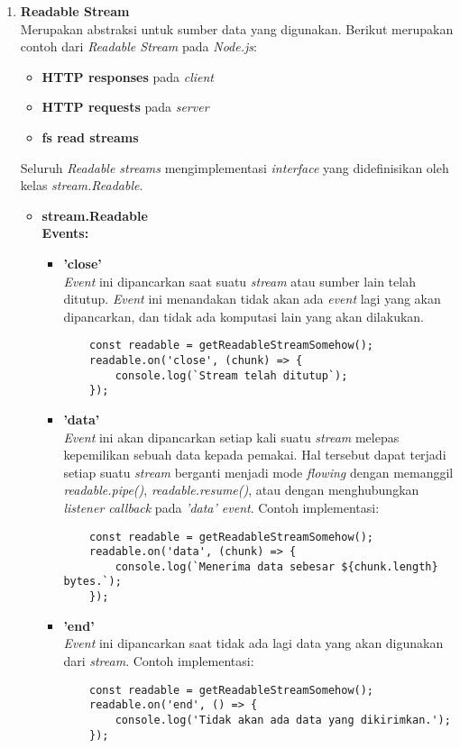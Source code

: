 \begin{enumerate}
	\item \textbf{Readable Stream} \\
	Merupakan abstraksi untuk sumber data yang digunakan. Berikut merupakan contoh dari \textit{Readable Stream} pada \textit{Node.js}:
	\begin{itemize}
		\item \textbf{HTTP responses} pada \textit{client}
		\item \textbf{HTTP requests} pada \textit{server}
		\item \textbf{fs read streams}
	\end{itemize}
	Seluruh \textit{Readable streams} mengimplementasi \textit{interface} yang didefinisikan oleh kelas \textit{stream.Readable}.
	
	\begin{itemize}
		\item \textbf{stream.Readable} \\
		\textbf{Events:}
			\begin{itemize}
				\item \textbf{'close'} \\ \textit{Event} ini dipancarkan saat suatu \textit{stream} atau sumber lain telah ditutup. \textit{Event} ini menandakan tidak akan ada \textit{event} lagi yang akan dipancarkan, dan tidak ada komputasi lain yang akan dilakukan.
	\begin{lstlisting}
	const readable = getReadableStreamSomehow();
	readable.on('close', (chunk) => {
		console.log(`Stream telah ditutup`);
	});
	\end{lstlisting}
	
				\item \textbf{'data'} \\ \textit{Event} ini akan dipancarkan setiap kali suatu \textit{stream} melepas kepemilikan sebuah data kepada pemakai. Hal tersebut dapat terjadi setiap suatu \textit{stream} berganti menjadi mode \textit{flowing} dengan memanggil \textit{readable.pipe()}, \textit{readable.resume()}, atau dengan menghubungkan \textit{listener callback} pada \textit{'data' event}. Contoh implementasi:
	\begin{lstlisting}
	const readable = getReadableStreamSomehow();
	readable.on('data', (chunk) => {
		console.log(`Menerima data sebesar ${chunk.length} bytes.`);
	});
	\end{lstlisting}
				
				\item \textbf{'end'} \\ \textit{Event} ini dipancarkan saat tidak ada lagi data yang akan digunakan dari \textit{stream}. Contoh implementasi:
	\begin{lstlisting}
	const readable = getReadableStreamSomehow();
	readable.on('end', () => {
		console.log('Tidak akan ada data yang dikirimkan.');
	});
	\end{lstlisting}
	

\end{itemize}
\end{itemize}
\end{enumerate}
